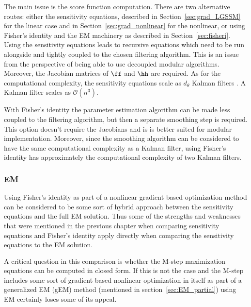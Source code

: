 The main issue is the score function computation. There are two alternative routes:
either the sensitivity equations, described in Section~\ref{sec:grad_LGSSM} for the linear
case and in Section~\ref{sec:grad_nonlinear} for the nonlinear, or using
Fisher's identity and the EM machinery as described in Section~\ref{sec:fisheri}.
Using the sensitivity equations leads to recursive equations which need
to be run alongside and tightly coupled to the chosen filtering algorithm.
This is an issue from the perspective of being able to use decoupled modular
algorithms. Moreover, the Jacobian matrices of $\ff$ and $\hh$ are required.
As for the computational complexity, the sensitivity equations scale
as $d_\theta$ Kalman filters \parencite{Cappe2005, Olsson2007}.
A Kalman filter scales as $\mathcal{O}(n^3)$. 

With Fisher's identity the parameter estimation algorithm can be made 
less coupled to the filtering algorithm, but then a separate smoothing
step is required. This option doesn't require the Jacobians and is
is better suited for modular implementation. Moreover, since
the smoothing algorithm can be considered to have the same computational
complexity as a Kalman filter, using Fisher's identity has approximately
the computational complexity of two Kalman filters.

  
\subsubsection*{EM}
  
Using Fisher's identity as part of a nonlinear gradient based optimization method 
can be considered to be some sort of hybrid approach between the sensitivity equations
and the full EM solution. Thus some of the strengths and weaknesses that were
mentioned in the previous chapter when comparing sensitivity equations and Fisher's identity
apply directly when comparing the sensitivity equations to the EM solution.

A critical question in this comparison is whether the M-step maximization equations
can be computed in closed form. If this is not the case and the M-step includes
some sort of gradient based nonlinear optimization in itself as part of a generalized
EM (gEM) method (mentioned in section~\ref{sec:EM_partial}) using EM certainly loses
some of its appeal. 

